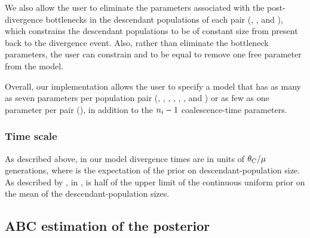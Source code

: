 \documentclass[letterpaper,12pt]{article}
\begin{document}
\begin{linenumbers}
We also allow the user to eliminate the parameters associated with
the post-divergence bottlenecks in the descendant populations of
each pair
(\bottleTime{}, , and ),
which constrains the descendant populations to be of
constant size from present back to the divergence event.
Also, rather than eliminate the bottleneck parameters, the user
can constrain  and  to be
equal to remove one free parameter from the model.

Overall, our implementation allows the user to specify a model that has as many
as seven parameters per population pair
(\ancestralTheta{}, , ,
\bottleTime{}, , , and
\migrationRate{})
or as few as one parameter per pair
(\myTheta{}),
in addition to the $\popSampleSize{i}{} - 1$ coalescence-time parameters.

\subsubsection*{Time scale}
As described above, in our model divergence times are in units of
$\theta_{C}/\mu$ generations, where  is the expectation
of the prior on descendant-population size.
As described by \citet{Oaks2012}, in \msb,  is half of the upper
limit of the continuous uniform prior on the mean of the descendant-population
sizes.

\subsection*{ABC estimation of the posterior}

\end{linenumbers}
\end{document}
